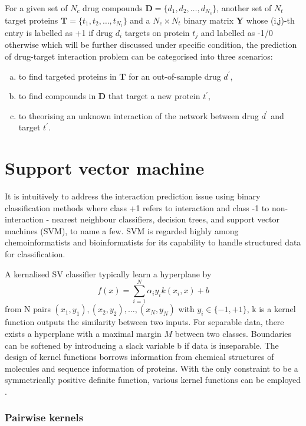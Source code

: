 \documentclass[a4paper,12pt]{report}
\begin{document}
For a given set of $N_c$ drug compounds $\mathbf{D} = \{d_1, d_2, \dots, d_{N_c}\}$, another set of $N_t$ target proteins $\mathbf{T} = \{t_1, t_2, \dots, t_{N_t}\}$ and a $N_c \times N_t$ binary matrix \textbf{Y} whose (i,j)-th entry is labelled as +1 if drug $d_i$ targets on protein $t_j$ and labelled as -1/0 otherwise which will be further discussed under specific condition, the prediction of drug-target interaction problem can be categorised into three scenarios: 
\begin{enumerate}[a.]
\item to find targeted proteins in \textbf{T} for an out-of-sample drug $d^{'}$, 
\item to find compounds in \textbf{D} that target a new protein $t^{'}$,
\item to theorising an unknown interaction of the network between drug $d^{'}$ and target $t^{'}$.
\end{enumerate}

\section{Support vector machine}

It is intuitively to address the interaction prediction issue using binary classification methods where class +1 refers to interaction and class -1 to non-interaction - nearest neighbour classifiers, decision trees, and support vector machines (SVM), to name a few. SVM is regarded highly among chemoinformatists and bioinformatists for its capability to handle structured data for classification. 

A kernalised SV classifier typically learn a hyperplane by 
\begin{equation}
f(x) = \sum^N_{i=1}\alpha_iy_ik(x_i,x) + b
\end{equation}
from N pairs $(x_1, y_1), (x_2, y_2), \dots , (x_N, y_N)$ with $y_i \in \{-1, +1\}$, k is a kernel function outputs the similarity between two inputs. For separable data, there exists a hyperplane with a maximal margin $M$ between two classes. Boundaries can be softened by introducing a slack variable b if data is inseparable. The design of kernel functions borrows information from chemical structures of molecules and sequence information of proteins. With the only constraint to be a symmetrically positive definite function, various kernel functions can be employed \citep{kern04}.

\subsubsection{Pairwise kernels}
\end{document}
